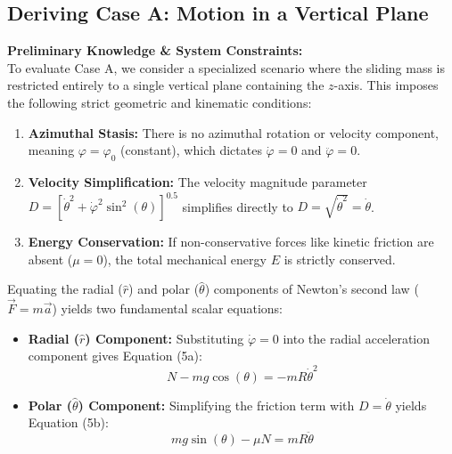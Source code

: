 \documentclass[11pt,letterpaper]{article}
\begin{document}
\subsection{Deriving Case A: Motion in a Vertical Plane}
\textbf{Preliminary Knowledge \& System Constraints:} \\
To evaluate Case A, we consider a specialized scenario where the sliding mass is restricted entirely to a single vertical plane containing the $z$-axis. This imposes the following strict geometric and kinematic conditions:
\begin{enumerate}
    \item \textbf{Azimuthal Stasis:} There is no azimuthal rotation or velocity component, meaning $\varphi = \varphi_0$ (constant), which dictates $\dot{\varphi} = 0$ and $\ddot{\varphi} = 0$.
    \item \textbf{Velocity Simplification:} The velocity magnitude parameter $D = [\dot{\theta}^2 + \dot{\varphi}^2\sin^2(\theta)]^{0.5}$ simplifies directly to $D = \sqrt{\dot{\theta}^2} = \dot{\theta}$.
    \item \textbf{Energy Conservation:} If non-conservative forces like kinetic friction are absent ($\mu=0$), the total mechanical energy $E$ is strictly conserved.
\end{enumerate}

Equating the radial ($\hat{r}$) and polar ($\hat{\theta}$) components of Newton's second law ($\vec{F} = m\vec{a}$) yields two fundamental scalar equations:
\begin{itemize}
    \item \textbf{Radial ($\hat{r}$) Component:} Substituting $\dot{\varphi}=0$ into the radial acceleration component gives Equation (5a):
    \begin{equation}\label{eq:radial_A}
    N - mg\cos(\theta) = -mR\dot{\theta}^2
    \end{equation}
    \item \textbf{Polar ($\hat{\theta}$) Component:} Simplifying the friction term with $D = \dot{\theta}$ yields Equation (5b):
    \begin{equation}\label{eq:polar_A}
    mg\sin(\theta) - \mu N = mR\ddot{\theta}
    \end{equation}
\end{itemize}
\end{document}
